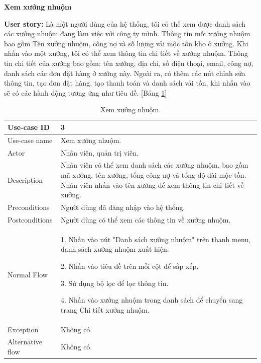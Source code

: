 \textbf{Xem xưởng nhuộm}\par
\textbf{User story:} Là một người dùng của hệ thống, tôi có thể xem được danh sách các xưởng nhuộm đang làm việc với công ty mình. Thông tin mỗi xưởng nhuộm bao gồm Tên xưởng nhuộm, công nợ và số lượng vải mộc tồn kho ở xưởng. Khi nhấn vào một xưởng, tôi có thể xem thông tin chi tiết về xưởng nhuộm. Thông tin chi tiết của xưởng bao gồm: tên xưởng, địa chỉ, số điện thoại, email, công nợ, danh sách các đơn đặt hàng ở xưởng này. Ngoài ra, có thêm các nút chỉnh sửa thông tin, tạo đơn đặt hàng, tạo thanh toán và danh sách vải tồn, khi nhấn vào sẽ có các hành động tương ứng như tiêu đề. [Bảng \ref{bang3}]
\begin{table}[H]
    \centering
    \begin{tabular}{|m{3cm}|m{10cm}|}
    \hline 
        Use-case ID & 3\\ \hline
        Use-case name & Xem xưởng nhuộm.\\ \hline
        Actor & Nhân viên, quản trị viên.\\ \hline
        Description & Nhân viên có thể xem danh sách các xưởng nhuộm, bao gồm mã xưởng, tên xưởng, tổng công nợ và tổng độ dài mộc tồn. Nhân viên nhấn vào tên xưởng để xem thông tin chi tiết về xưởng.\\ \hline
        Preconditions & Người dùng đã đăng nhập vào hệ thống.\\ \hline
        Postconditions & Người dùng có thể xem các thông tin về xưởng nhuộm.\\ \hline
        Normal Flow & 
        1. Nhấn vào nút "Danh sách xưởng nhuộm" trên thanh menu, danh sách xưởng nhuộm xuất hiện.\par
        2. Nhấn vào tiêu đề trên mỗi cột để sắp xếp.\par
        3. Sử dụng bộ lọc để lọc thông tin.\par
        4. Nhấn vào xưởng nhuộm trong danh sách để chuyển sang trang Chi tiết xưởng nhuộm.\par
        \\ \hline
        Exception & Không có.\\ \hline
        Alternative flow & 
        Không có. \par
        \\ 
    \hline 
    \end{tabular}
    \caption{Xem xưởng nhuộm.}
    \label{bang3}
\end{table}


